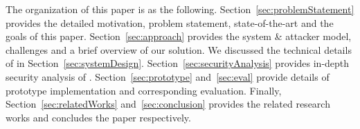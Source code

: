  The organization of this paper is as the following. Section~\ref{sec:problemStatement} provides the detailed motivation, problem statement, state-of-the-art and the goals of this paper. Section~\ref{sec:approach} provides the system \& attacker model, challenges and a brief overview of our solution. We discussed the technical details of \name in Section~\ref{sec:systemDesign}. Section~\ref{sec:securityAnalysis} provides in-depth security analysis of \name. Section~\ref{sec:prototype} and~\ref{sec:eval} provide details of \name prototype implementation and corresponding evaluation. Finally, Section~\ref{sec:relatedWorks} and~\ref{sec:conclusion} provides the related research works and concludes the paper respectively.




